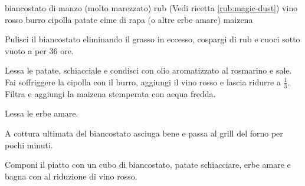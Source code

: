 \begin{ingreds}
	biancostato di manzo (molto marezzato) 
	rub (Vedi ricetta \ref{rub:magic-dust})
	vino rosso
	burro 
	cipolla 
	patate 
	cime di rapa  (o altre erbe amare)
	maizena 

\end{ingreds}

\begin{method}
Pulisci il biancostato eliminando il grasso in eccesso, cospargi di rub e cuoci sotto vuoto a  per 36 ore.

Lessa le patate, schiacciale e condisci con olio aromatizzato al rosmarino e sale. Fai soffriggere la cipolla con il burro, aggiungi il vino rosso e lascia ridurre a $\frac{1}{3}$. Filtra e aggiungi la maizena stemperata con acqua fredda.

Lessa le erbe amare.

A cottura ultimata del biancostato asciuga bene e passa al grill del forno per pochi minuti.

Componi il piatto con un cubo di biancostato, patate schiacciare, erbe amare  e bagna con al riduzione di vino rosso.


\end{method}



